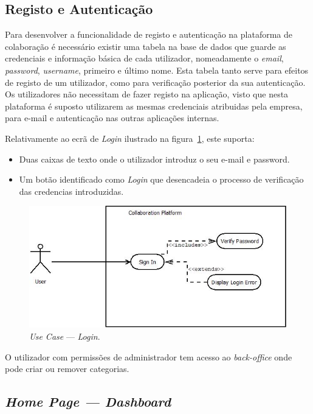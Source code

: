 \subsection{Registo e Autenticação}\label{subsec:login}
Para desenvolver a funcionalidade de registo e autenticação na plataforma de colaboração é necessário existir uma tabela 
na base de dados que guarde as credenciais e informação básica de cada utilizador, nomeadamente 
o \textit{email}, \textit{password}, \textit{username}, primeiro e último nome. 
Esta tabela tanto serve para efeitos de registo de um utilizador, como para verificação posterior da sua autenticação. 
Os utilizadores não necessitam de fazer registo na aplicação, visto que nesta plataforma é suposto utilizarem 
as mesmas credenciais atribuidas pela empresa, para e-mail e autenticação nas outras aplicações internas.

Relativamente ao ecrã de \textit{Login} ilustrado na figura~\ref{fig:uc:login}, este suporta:

\begin{itemize}
    \item Duas caixas de texto onde o utilizador introduz o seu e-mail e password.
    \item Um botão identificado como \textit{Login} que desencadeia o processo de verificação das credencias introduzidas.
\end{itemize}

\begin{figure}[H]
    \centering
    \includegraphics[scale=0.6]{figures/Login Use Case.jpeg}
    \caption{\textit{Use Case} --- \textit{Login}.}\label{fig:uc:login}
\end{figure}

O utilizador com permissões de administrador tem acesso ao \textit{back-office} onde pode criar ou remover categorias.

\subsection{\textit{Home Page --- Dashboard}}\label{subsec:dashboard}

